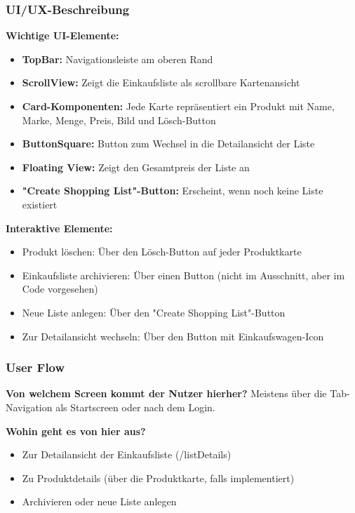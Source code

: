 \documentclass[12pt, a4paper]{report} %
\begin{document}
\subsubsection{UI/UX-Beschreibung}

\textbf{Wichtige UI-Elemente:}
\begin{itemize}
    \item \textbf{TopBar:} Navigationsleiste am oberen Rand
    \item \textbf{ScrollView:} Zeigt die Einkaufsliste als scrollbare Kartenansicht
    \item \textbf{Card-Komponenten:} Jede Karte repräsentiert ein Produkt mit Name, Marke, Menge, Preis, Bild und Lösch-Button
    \item \textbf{ButtonSquare:} Button zum Wechsel in die Detailansicht der Liste
    \item \textbf{Floating View:} Zeigt den Gesamtpreis der Liste an
    \item \textbf{"Create Shopping List"-Button:} Erscheint, wenn noch keine Liste existiert
\end{itemize}

\noindent\textbf{Interaktive Elemente:}
\begin{itemize}
    \item Produkt löschen: Über den Lösch-Button auf jeder Produktkarte
    \item Einkaufsliste archivieren: Über einen Button (nicht im Ausschnitt, aber im Code vorgesehen)
    \item Neue Liste anlegen: Über den "Create Shopping List"-Button
    \item Zur Detailansicht wechseln: Über den Button mit Einkaufswagen-Icon
\end{itemize}

\subsubsection{User Flow}

\textbf{Von welchem Screen kommt der Nutzer hierher?}
Meistens über die Tab-Navigation als Startscreen oder nach dem Login.

\noindent\textbf{Wohin geht es von hier aus?}
\begin{itemize}
    \item Zur Detailansicht der Einkaufsliste (/listDetails)
    \item Zu Produktdetails (über die Produktkarte, falls implementiert)
    \item Archivieren oder neue Liste anlegen
\end{itemize}
\end{document}
